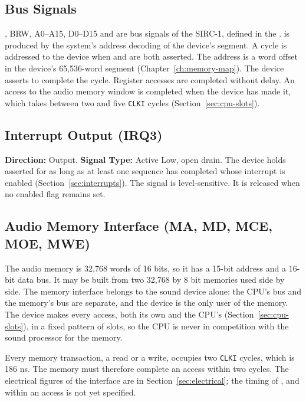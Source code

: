 \subsection{Bus Signals}

, BRW, A0--A15, D0--D15 and  are bus signals of the SIRC-1, defined in the \hwmanual{}.  is produced by the system's address decoding of the device's segment. A cycle is addressed to the device when  and  are both
asserted. The address is a word offset in the device's 65,536-word segment (Chapter~\ref{ch:memory-map}). The device
asserts  to complete the cycle. Register accesses are completed without delay. An access to the audio
memory window is completed when the device has made it, which takes between two and five \texttt{CLKI} cycles
(Section~\ref{sec:cpu-slots}).

\subsection{Interrupt Output (IRQ3)}
\label{sec:pin-irq3}

\textbf{Direction:} Output. \textbf{Signal Type:} Active Low, open drain. The device holds  asserted
for as long as at least one sequence has completed whose interrupt is enabled (Section~\ref{sec:interrupts}). The
signal is level-sensitive. It is released when no enabled flag remains set.

\subsection{Audio Memory Interface (MA, MD, MCE, MOE, MWE)}
\label{sec:memory-interface}

The audio memory is 32,768 words of 16 bits, so it has a 15-bit address and a 16-bit data bus. It may be built from two
32,768 by 8 bit memories used side by side. The memory interface belongs to the sound device alone: the CPU's bus and
the memory's bus are separate, and the device is the only user of the memory. The device makes every access, both its
own and the CPU's (Section~\ref{sec:cpu-slots}), in a fixed pattern of slots, so the CPU is never in competition with
the sound processor for the memory.

Every memory transaction, a read or a write, occupies two \texttt{CLKI} cycles, which is 186 ns. The memory must
therefore complete an access within two cycles. The electrical figures of the interface are in
Section~\ref{sec:electrical}; the timing of ,  and  within an access is
not yet specified.

